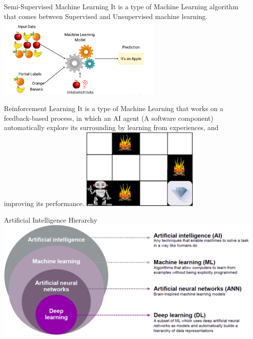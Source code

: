 \documentclass{beamer}
\begin{document}
    \begin{frame}[label=ssml]{Semi-Supervised Machine Learning}
      It is a type of Machine Learning algorithm that comes between Supervised and Unsupervised machine learning.
      \vfill
      \centering
            \includegraphics[height=40mm]{resources/semisupervised-machine-learning}
    \end{frame}

    \begin{frame}[label=rl]{Reinforcement Learning}
      \justifying It is a type of Machine Learning that works on a feedback-based process, in which an AI agent (A software component) automatically explore its surrounding by learning from experiences, and improving its performance.
      \vfill
      \centering
            \includegraphics[height=40mm]{resources/reinforcement}
    \end{frame}  
    
    \begin{frame}{Artificial Intelligence Hierarchy}
        \includegraphics{resources/hierarchy}
    \end{frame}
\end{document}
